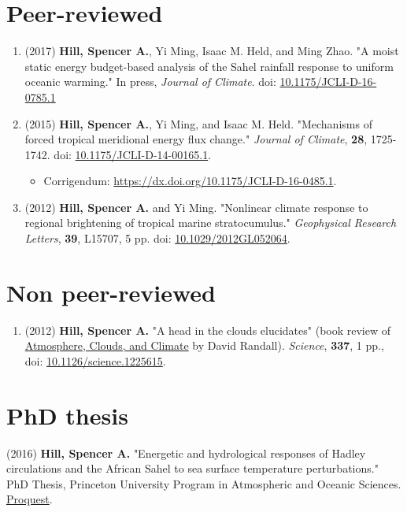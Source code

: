 \documentclass[12pt,letterpaper]{shillcv}
\begin{document}
\section*{Peer-reviewed}
\label{sec:org5ac42df}
\begin{enumerate}
\item (2017) \textbf{Hill, Spencer A.}, Yi Ming, Isaac M. Held, and Ming Zhao.  "A moist
static energy budget-based analysis of the Sahel rainfall response to uniform
oceanic warming."  In press, \emph{Journal of Climate}.  doi: \href{https://doi.org/10.1175/JCLI-D-16-0785.1}{10.1175/JCLI-D-16-0785.1}
\item (2015) \textbf{Hill, Spencer A.}, Yi Ming, and Isaac M. Held. "Mechanisms of forced
tropical meridional energy flux change."  \emph{Journal of Climate}, \textbf{28}, 1725-1742.
doi: \href{http://dx.doi.org/10.1175/JCLI-D-14-00165.1}{10.1175/JCLI-D-14-00165.1}.
\begin{itemize}
\item Corrigendum: \url{https://dx.doi.org/10.1175/JCLI-D-16-0485.1}.
\end{itemize}
\item (2012) \textbf{Hill, Spencer A.} and Yi Ming. "Nonlinear climate response to regional
brightening of tropical marine stratocumulus."  \emph{Geophysical Research Letters},
\textbf{39}, L15707, 5 pp. doi:
\href{http://dx.doi.org/10.1029/2012GL052064}{10.1029/2012GL052064}.
\end{enumerate}
\section*{Non peer-reviewed}
\label{sec:org4bd4c02}
\begin{enumerate}
\item (2012) \textbf{Hill, Spencer A.} "A head in the clouds elucidates" (book review of
\href{http://press.princeton.edu/titles/9773.html}{Atmosphere, Clouds, and Climate} by David Randall). \emph{Science}, \textbf{337}, 1 pp., doi: \href{http://dx.doi.org/10.1126/science.1225615}{10.1126/science.1225615}.
\end{enumerate}
\section*{PhD thesis}
\label{sec:org9ba3ee4}
(2016) \textbf{Hill, Spencer A.} "Energetic and hydrological responses of Hadley circulations and the African Sahel to sea surface temperature perturbations."  PhD Thesis, Princeton University Program in Atmospheric and Oceanic Sciences.  \href{http://search.proquest.com.ezproxy.princeton.edu/pqdtglobal/docview/1831357756/abstract/522E2D42A8BF49C0PQ/1}{Proquest}.
\end{document}
